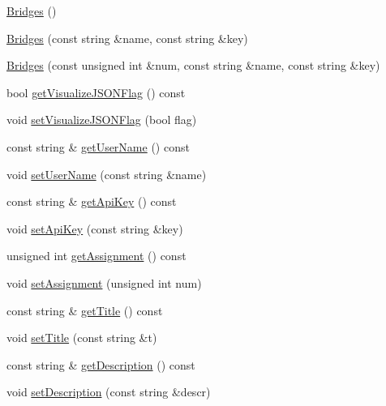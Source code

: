 \begin{DoxyCompactItemize}
\item 
\mbox{\hyperlink{classbridges_1_1_bridges_aab8b250b2b5ba0034ceb2494fe5ea437}{Bridges}} ()
\item 
\mbox{\hyperlink{classbridges_1_1_bridges_a21d9e98cb1f3994300079b489f14e71e}{Bridges}} (const string \&name, const string \&key)
\item 
\mbox{\hyperlink{classbridges_1_1_bridges_a84162a660dec9f7bc11e1f01cada4179}{Bridges}} (const unsigned int \&num, const string \&name, const string \&key)
\item 
bool \mbox{\hyperlink{classbridges_1_1_bridges_a6c2897b19a25989e09c031152a74317d}{get\+Visualize\+J\+S\+O\+N\+Flag}} () const
\item 
void \mbox{\hyperlink{classbridges_1_1_bridges_a69aca37ab2729d0345e0549d7baf0423}{set\+Visualize\+J\+S\+O\+N\+Flag}} (bool flag)
\item 
const string \& \mbox{\hyperlink{classbridges_1_1_bridges_ad16be2d94936fd555bc05f58c8c21f50}{get\+User\+Name}} () const
\item 
void \mbox{\hyperlink{classbridges_1_1_bridges_ab0b00033e54d25968f5ecb61c31c7de3}{set\+User\+Name}} (const string \&name)
\item 
const string \& \mbox{\hyperlink{classbridges_1_1_bridges_a9a44f38d883859ef19c94ce17eec43b5}{get\+Api\+Key}} () const
\item 
void \mbox{\hyperlink{classbridges_1_1_bridges_a3f9f21464393b8fce79a77809c6aa17e}{set\+Api\+Key}} (const string \&key)
\item 
unsigned int \mbox{\hyperlink{classbridges_1_1_bridges_aa45b4ba781b5cbecc8cb04c76dfd527a}{get\+Assignment}} () const
\item 
void \mbox{\hyperlink{classbridges_1_1_bridges_aca7a68fb8cc0d1bec81656dfa77b1162}{set\+Assignment}} (unsigned int num)
\item 
const string \& \mbox{\hyperlink{classbridges_1_1_bridges_a8fe8c79b0f852c0049a699c801e40a61}{get\+Title}} () const
\item 
void \mbox{\hyperlink{classbridges_1_1_bridges_ac9f2e0b5fd5c70053db233dcbb636b56}{set\+Title}} (const string \&t)
\item 
const string \& \mbox{\hyperlink{classbridges_1_1_bridges_ae9f238e1d9fc421c6c08aacb74e0ef6c}{get\+Description}} () const
\item 
void \mbox{\hyperlink{classbridges_1_1_bridges_aa26285a4d04c2759113dcf233406a8da}{set\+Description}} (const string \&descr)
\item 

\end{DoxyCompactItemize}
